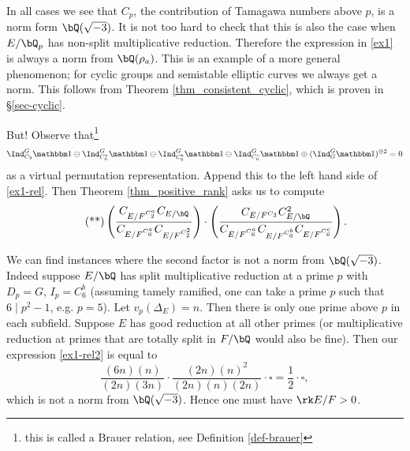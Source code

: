 \begin{example}
    In all cases we see that $C_p$, the contribution of Tamagawa numbers above $p$, is a norm form $\bQ(\sqrt{-3})$. It is not too hard to check that this is also the case when $E / \bQ_p$ has non-split multiplicative reduction. Therefore the expression in \eqref{ex1} is always a norm from $\bQ(\rho_a)$. This is an example of a more general phenomenon; for cyclic groups and semistable elliptic curves we always get a norm. This follows from  Theorem \ref{thm_consistent_cyclic}, which is proven in \S\ref{sec-cyclic}.

    But! Observe that{\footnote{this is called a Brauer relation, see Definition \ref{def-brauer}}} 
    \[ \Ind_{C_3}^G \trivial \ominus \Ind_{C_6^a}^G \trivial \ominus \Ind_{C_6^b}^G \trivial \ominus \Ind_{C_6^c}^G \trivial \oplus (\Ind_G^G \trivial)^{\oplus 2} = 0 \]
    as a virtual permutation representation. Append this to the left hand side of \eqref{ex1-rel}. Then Theorem \ref{thm_positive_rank} asks us to compute 
    \begin{equation}\label{ex1-rel2}\tag{**}
    \left(\frac{C_{E / F^{C_2^a}} C_{E / \bQ} }{C_{E / F^{C_6^a}} C_{E / F^{C_2^2}}}\right) \cdot \left( \frac{C_{E / F^{C_3}} C_{E / \bQ}^2}{C_{E / F^{C_6^a}}C_{E / F^{C_6^b}}  C_{E / F^{C_6^c}} } \right). 
    \end{equation}
    
    We can find instances where the second factor is not a norm from $\bQ(\sqrt{-3})$. Indeed suppose $E / \bQ$ has split multiplicative reduction at a prime $p$ with $D_p = G$, $I_p = C_6^b$ (assuming tamely ramified, one can take a prime $p$ such that $6 \mid p^2 - 1$, e.g. $p = 5$). Let $v_p(\Delta_E) = n$. Then there is only one prime above $p$ in each subfield. Suppose $E$ has good reduction at all other primes (or multiplicative reduction at primes that are totally split in $F / \bQ$ would also be fine).
     Then our expression \eqref{ex1-rel2} is equal to
     \[ \frac{(6n)(n)}{(2n) (3n)} \cdot \frac{(2n)(n)^2}{(2n)(n)(2n)} \cdot \square = \frac{1}{2} \cdot \square, \] 
     which is not a norm from $\bQ(\sqrt{-3})$. Hence one must have $\rk E / F > 0$. 
\end{example}

